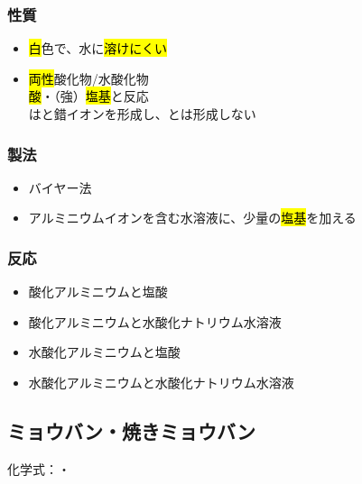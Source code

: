  \subsubsection{性質}
 \begin{itemize}
  \item \hl{白}色で、水に\hl{溶けにくい}\\
  \item \hl{両性}酸化物/水酸化物\\
  \hl{酸}・（強）\hl{塩基}と反応\\
  は\hl{}と錯イオンを形成し、\hl{}とは形成しない
 \end{itemize}
 \subsubsection{製法}
 \begin{itemize}
  \item バイヤー法
  \item アルミニウムイオンを含む水溶液に、少量の\hl{塩基}を加える \\
 \end{itemize}
 \subsubsection{反応}
 \begin{itemize}
 \item 酸化アルミニウムと塩酸\\
  \item 酸化アルミニウムと水酸化ナトリウム水溶液\\
  \item 水酸化アルミニウムと塩酸\\
  \item 水酸化アルミニウムと水酸化ナトリウム水溶液\\
 \end{itemize}
 \subsection{ミョウバン・焼きミョウバン}
 化学式：\hl{}・\hl{}
